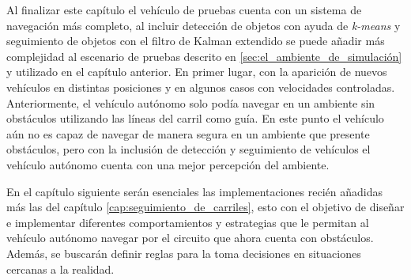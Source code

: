 Al finalizar este capítulo el vehículo de pruebas cuenta con un sistema de navegación más completo, al incluir detección de objetos con ayuda de \textit{k-means} y seguimiento de objetos con el filtro de Kalman extendido se puede añadir más complejidad al escenario de pruebas descrito en \ref{sec:el_ambiente_de_simulación} y utilizado en el capítulo anterior. En primer lugar, con la aparición de nuevos vehículos en distintas posiciones y en algunos casos con velocidades controladas. Anteriormente, el vehículo autónomo solo podía navegar en un ambiente sin obstáculos utilizando las líneas del carril como guía. En este punto el vehículo aún no es capaz de navegar de manera segura en un ambiente que presente obstáculos, pero con la inclusión de detección y seguimiento de vehículos el vehículo autónomo cuenta con una mejor percepción del ambiente.

En el capítulo siguiente serán esenciales las implementaciones recién añadidas más las del capítulo \ref{cap:seguimiento_de_carriles}, esto con el objetivo de diseñar e implementar diferentes comportamientos y estrategias que le permitan al vehículo autónomo navegar por el circuito que ahora cuenta con obstáculos. Además, se buscarán definir reglas para la toma decisiones en situaciones cercanas a la realidad.

